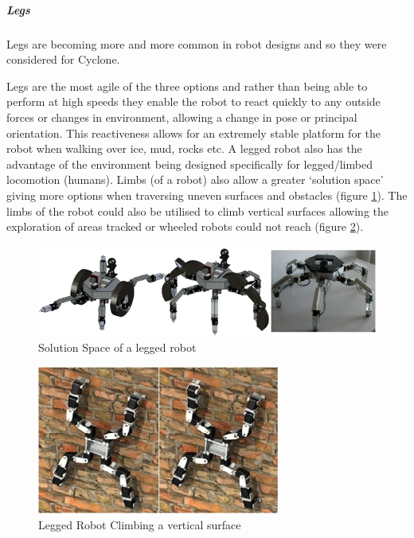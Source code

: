 \subparagraph*{Legs}

Legs are becoming more and more common in robot designs and so they were considered for Cyclone.\par

Legs are the most agile of the three options and rather than being able to perform at high speeds they enable the robot to react quickly to any outside forces or changes in environment, allowing a change in pose or principal orientation. This reactiveness allows for an extremely stable platform for the robot when walking over ice, mud, rocks etc. A legged robot also has the advantage of the environment being designed specifically for legged/limbed locomotion (humans). Limbs (of a robot) also allow a greater ‘solution space’ giving more options when traversing uneven surfaces and obstacles (figure \ref{fig:solutionspace}). The limbs of the robot could also be utilised to climb vertical surfaces allowing the exploration of areas tracked or wheeled robots could not reach (figure \ref{fig:legclimb}).\par

\begin{figure}[h]
\centering\includegraphics[width=0.6\linewidth]{Images/DT_Fig_8.png}
\caption{Solution Space of a legged robot}
\label{fig:solutionspace}
\end{figure}
\begin{figure}[h]
\centering\includegraphics[width=0.6\linewidth]{Images/DT_Fig_9.png}
\caption{Legged Robot Climbing a vertical surface}
\label{fig:legclimb}
\end{figure}

